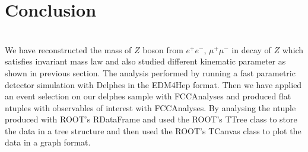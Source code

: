 \chapter{\label{summary}Conclusion}

\setcounter{equation}{0}
\setcounter{table}{0}
\setcounter{figure}{0}
\baselineskip 24pt
\hspace{10pt}
\\

We  have reconstructed  the mass of $Z$ boson from  $e^{+}e^{-}$, $\mu^{+}\mu^{-}$   in decay of $Z$ which satisfies invariant mass law  and also studied different kinematic parameter as shown in previous section.
The analysis performed by  running  a fast parametric detector simulation with Delphes in the EDM4Hep format. Then 
we have 
applied  an event selection on our delphes sample with FCCAnalyses
and  produced flat ntuples with observables of interest with FCCAnalyses.
By analysing the  ntuple  produced with ROOT's RDataFrame
and  used  the  ROOT's  TTree  class  to  store  the  data  in  a  tree  structure  and  then  used  the  ROOT's  TCanvas  class  to  plot  the  data  in  a  graph  format.